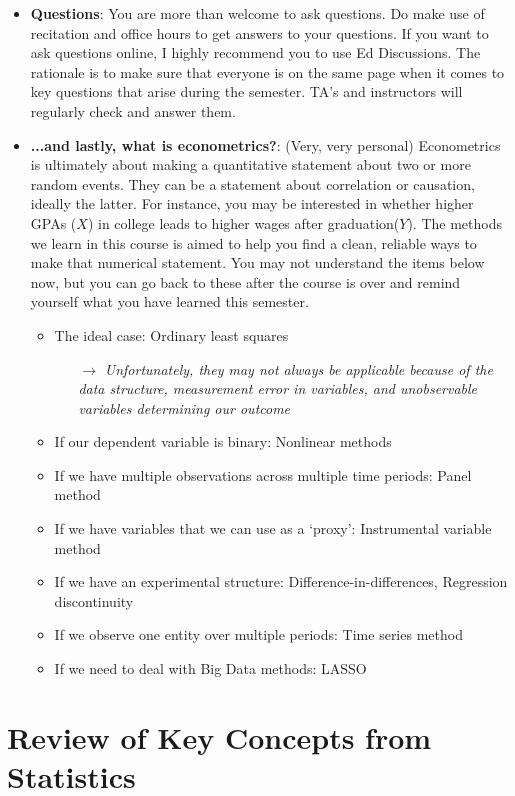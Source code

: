 \documentclass[12pt]{article}
\theoremstyle{definition}
\theoremstyle{property}
\theoremstyle{assumption}
\theoremstyle{example}
\theoremstyle{comment}
\begin{document}
\begin{itemize}
\item \textbf{Questions}: You are more than welcome to ask questions. Do make use of recitation and office hours to get answers to your questions. If you want to ask questions online, I highly recommend you to use Ed Discussions. The rationale is to make sure that everyone is on the same page when it comes to key questions that arise during the semester. TA's and instructors will regularly check and answer them. 


\item \textbf{...and lastly, what is econometrics?}: (Very, very personal) Econometrics is ultimately about making a quantitative statement about two or more random events. They can be a statement about correlation or causation, ideally the latter. For instance, you may be interested in whether higher GPAs ($X$) in college leads to higher wages after graduation($Y$). The methods we learn in this course is aimed to help you find a clean, reliable ways to make that numerical statement. You may not understand the items below now, but you can go back to these after the course is over and remind yourself what you have learned this semester. 
\begin{itemize}
\item The ideal case: Ordinary least squares
\begin{itemize}
\item[$\to$]  \textit{Unfortunately, they may not always be applicable because of the data structure, measurement error in variables, and unobservable variables determining our outcome}
\end{itemize}
\item If our dependent variable is binary: Nonlinear methods
\item If we have multiple observations across multiple time periods: Panel method
\item If we have variables that we can use as a `proxy': Instrumental variable method
\item If we have an experimental structure: Difference-in-differences, Regression discontinuity
\item If we observe one entity over multiple periods: Time series method
\item If we need to deal with Big Data methods: LASSO
\end{itemize}
\end{itemize}

\section{Review of Key Concepts from Statistics}
\end{document}
